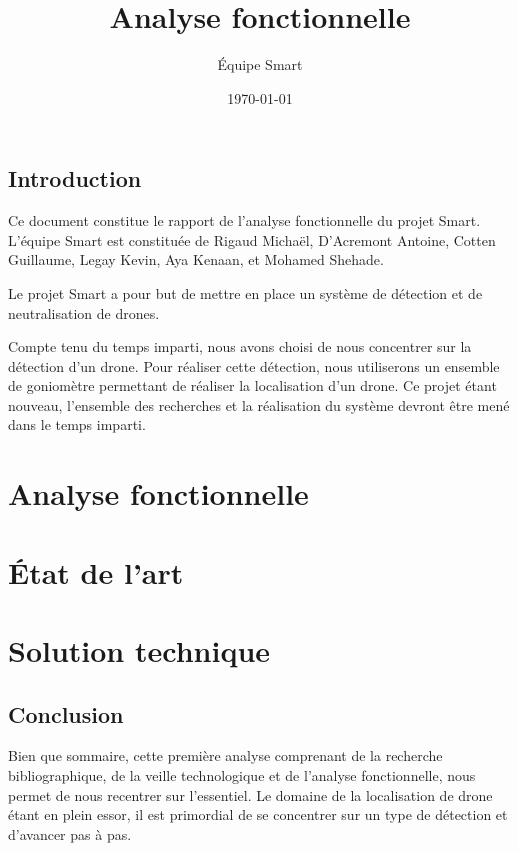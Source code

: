 \documentclass[a4paper, 11pt, oneside]{memoir}
\title{Analyse fonctionnelle}
\author{Équipe Smart}
\date{\today}
\newcounter{rem}[chapter]
\newcounter{th}[chapter]
\begin{document}
\maketitle
\thispagestyle{empty}
\newpage

\tableofcontents

\newpage

\chapter*{Introduction}

Ce document constitue le rapport de l'analyse fonctionnelle du projet Smart.
L'équipe Smart est constituée de Rigaud Michaël, D'Acremont Antoine, Cotten Guillaume, Legay Kevin, Aya Kenaan, et Mohamed Shehade.

Le projet Smart a pour but de mettre en place un système de détection et de neutralisation de drones.

Compte tenu du temps imparti, nous avons choisi de nous concentrer sur la détection d'un drone. Pour réaliser cette détection, nous utiliserons un ensemble de goniomètre permettant de réaliser la localisation d'un drone. Ce projet étant nouveau, l'ensemble des recherches et la réalisation du système devront être mené dans le temps imparti.



\newpage


\part{Analyse fonctionnelle}



\part{État de l'art}



\part{Solution technique}



\chapter*{Conclusion}
Bien que sommaire, cette première analyse comprenant de la recherche bibliographique, de la veille technologique et de l'analyse fonctionnelle, nous permet de nous recentrer sur l'essentiel. Le domaine de la localisation de drone étant en plein essor, il est primordial de se concentrer sur un type de détection et d'avancer pas à pas.
\end{document}
